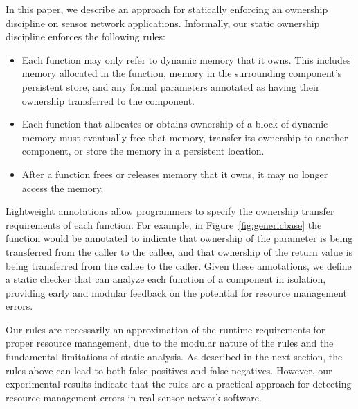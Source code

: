 
%

In this paper, we describe an approach for statically enforcing an
ownership discipline on sensor network applications.  Informally, our
static ownership discipline enforces the following rules:
%
\begin{itemize}
%
\item Each function may only refer to dynamic memory that it owns.
This includes memory allocated in the function, memory in the
surrounding component's persistent store, and any formal parameters
annotated as having their ownership transferred to the component.
%
\item Each function that allocates or obtains ownership of a block of
dynamic memory must eventually free that memory, transfer its
ownership to another component, or store the memory in a persistent
location.
%
\item After a function frees or releases memory that it owns, it may
no longer access the memory.
%
\end{itemize}


Lightweight annotations allow programmers to specify the ownership
transfer requirements of each function.  For example, in
Figure~\ref{fig:genericbase} the  function would be
annotated to indicate that ownership of the  parameter
is being transferred from the caller to the callee, and that ownership
of the return value is being transferred from the callee to the
caller.  Given these annotations, we define a static checker that can
analyze each function of a component in isolation, providing early and
modular feedback on the potential for resource management errors.


Our rules are necessarily an approximation of the runtime
requirements for proper resource management, due to the modular nature
of the rules and the fundamental limitations of static analysis.  
As described in the next
section, the rules above can lead to both false positives and false
negatives.  However, our experimental results indicate that the rules
are a practical approach for detecting resource management errors in
real sensor network software.


